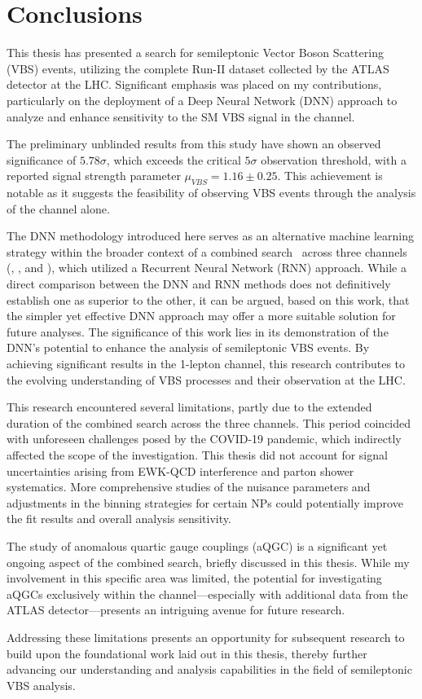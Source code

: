 \clearpage
\section{Conclusions}

This thesis has presented a search for semileptonic Vector Boson Scattering (VBS) events, utilizing the complete Run-II dataset collected by the ATLAS detector at the LHC. Significant emphasis was placed on my contributions, particularly on the deployment of a Deep Neural Network (DNN) approach to analyze and enhance sensitivity to the SM VBS signal in the \olep channel.

The preliminary unblinded results from this study have shown an observed significance of $5.78\sigma$, which exceeds the critical $5\sigma$ observation threshold, with a reported signal strength parameter $\mu_{VBS} = 1.16 \pm 0.25$. This achievement is notable as it suggests the feasibility of observing VBS events through the analysis of the \olep channel alone.

The DNN methodology introduced here serves as an alternative machine learning strategy within the broader context of a combined search~\cite{Charlton:2808769} across three channels (\zlep, \olep, and \tlep), which utilized a Recurrent Neural Network (RNN) approach. While a direct comparison between the DNN and RNN methods does not definitively establish one as superior to the other, it can be argued, based on this work, that the simpler yet effective DNN approach may offer a more suitable solution for future analyses.
The significance of this work lies in its demonstration of the DNN’s potential to enhance the analysis of semileptonic VBS events. By achieving significant results in the 1-lepton channel, this research contributes to the evolving understanding of VBS processes and their observation at the LHC.

This research encountered several limitations, partly due to the extended duration of the combined search across the three channels. This period coincided with unforeseen challenges posed by the COVID-19 pandemic, which indirectly affected the scope of the investigation.
This thesis did not account for signal uncertainties arising from EWK-QCD interference and parton shower systematics. More comprehensive studies of the nuisance parameters and adjustments in the binning strategies for certain NPs could potentially improve the fit results and overall analysis sensitivity.

The study of anomalous quartic gauge couplings (aQGC) is a significant yet ongoing aspect of the combined search, briefly discussed in this thesis. While my involvement in this specific area was limited, the potential for investigating aQGCs exclusively within the \olep channel—especially with additional data from the ATLAS detector—presents an intriguing avenue for future research.

Addressing these limitations presents an opportunity for subsequent research to build upon the foundational work laid out in this thesis, thereby further advancing our understanding and analysis capabilities in the field of semileptonic VBS analysis.

